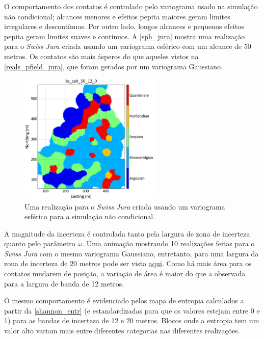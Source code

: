 O comportamento dos contatos é controlado pelo variograma usado na simulação não condicional; alcances menores e efeitos pepita maiores geram limites irregulares e descontínuos. Por outro lado, longos alcances e pequenos efeitos pepita geram limites suaves e contínuos. A \autoref{sph_jura} mostra uma realização para o \textit{Swiss Jura} criada usando um variograma esférico com um alcance de 50 metros. Os contatos são mais ásperos do que aqueles vistos na \autoref{reals_pfield_jura}, que foram gerados por um variograma Gaussiano.

\begin{figure}[H]
	\caption{\label{sph_jura} Uma realização para o \textit{Swiss Jura} criada usando um variograma esférico para a simulação não condicional.}
	\centering
		\includegraphics[width=0.6\textwidth]{capitulo_3/imagens/sph_real_0_50_12.png}
\end{figure}

A magnitude da incerteza é controlada tanto pela largura de zona de incerteza quanto pelo parâmetro $\omega$. Uma animação mostrando 10 realizações feitas para o \textit{Swiss Jura} com o mesmo variograma Gaussiano, entretanto, para uma largura da zona de incerteza de 20 metros pode ser vista \href{https://github.com/robertorolo/assessing_geological_model_uncertainty_with_probability_fields/blob/main/ezgif-2-721b458d5c70.gif}{aqui}. Como há mais área para os contatos mudarem de posição, a variação de área é maior do que a observada para a largura de banda de 12 metros. 

O mesmo comportamento é evidenciado pelos mapa de entropia calculados a partir da \autoref{shannon_entr} (e estandardizadas para que os valores estejam entre 0 e 1) para as bandas de incerteza de 12 e 20 metros. Blocos onde a entropia tem um valor alto variam mais entre diferentes categorias nas diferentes realizações. 

